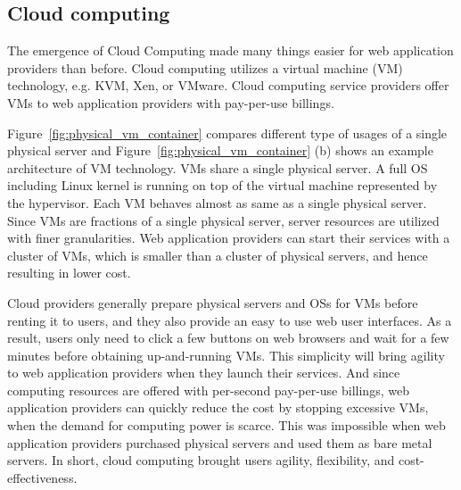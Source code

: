 \subsection{Cloud computing}

The emergence of Cloud Computing made many things easier for web application providers than before.
Cloud computing utilizes a virtual machine (VM) technology, e.g. KVM, Xen, or VMware.
Cloud computing service providers offer VMs to web application providers with pay-per-use billings.

Figure~\ref{fig:physical_vm_container} compares different type of usages of a single physical server and Figure~\ref{fig:physical_vm_container} (b) shows an example architecture of VM technology.
VMs share a single physical server.
A full OS including Linux kernel is running on top of the virtual machine represented by the hypervisor.
Each VM behaves almost as same as a single physical server.
Since VMs are fractions of a single physical server, server resources are utilized with finer granularities.
Web application providers can start their services with a cluster of VMs, which is smaller than a cluster of physical servers, and hence resulting in lower cost.

Cloud providers generally prepare physical servers and OSs for VMs before renting it to users, and they also provide an easy to use web user interfaces.
As a result, users only need to click a few buttons on web browsers and wait for a few minutes before obtaining up-and-running VMs.
This simplicity will bring agility to web application providers when they launch their services.
And since computing resources are offered with per-second pay-per-use billings, web application providers can quickly reduce the cost by stopping excessive VMs, when the demand for computing power is scarce.
This was impossible when web application providers purchased physical servers and used them as bare metal servers.
In short, cloud computing brought users agility, flexibility, and cost-effectiveness.

